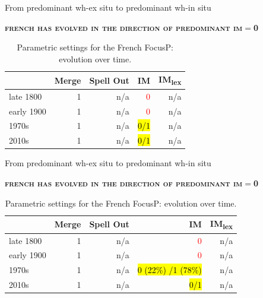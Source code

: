 \documentclass[lesson_slides]{subfiles}
\begin{document}
\begin{frame}[c]{From predominant wh-ex situ to predominant wh-in situ}

        \textbf{\textsc{french has evolved in the direction of predominant im$=$0}}

        \begin{table}[H]
        \centering
        \begin{tabular}{|l|r|r|r|r|}
        \hline
         & Merge & Spell Out & IM & IM\textsubscript{lex} \\
        \hline
        late 1800 & 1 & n/a & \textcolor{red}{0} & n/a \\
        \hline
        early 1900 & 1 & n/a & \textcolor{red}{0} & n/a \\
        \hline
        1970s & 1 & n/a & \hl{0/1} & n/a \\
        \hline
        2010s & 1 & n/a & \hl{0/1} & n/a \\
        \hline
        \end{tabular}
        \caption{\label{tab:samp}Parametric settings for the French FocusP: evolution over time.}
    \end{table}
  
\end{frame}
\begin{frame}[c]{From predominant wh-ex situ to predominant wh-in situ}

        \textbf{\textsc{french has evolved in the direction of predominant im$=$0}}

        \begin{table}[H]
        \centering
        \begin{tabular}{|l|r|r|r|r|}
        \hline
         & Merge & Spell Out & IM & IM\textsubscript{lex} \\
        \hline
        late 1800 & 1 & n/a & \textcolor{red}{0} & n/a \\
        \hline
        early 1900 & 1 & n/a & \textcolor{red}{0} & n/a \\
        \hline
        1970s & 1 & n/a & \hl{0 (22\%) /1 (78\%)} & n/a \\
        \hline
        2010s & 1 & n/a & \hl{0/1} & n/a \\
        \hline
        \end{tabular}
        \caption{\label{tab:samp}Parametric settings for the French FocusP: evolution over time.}
    \end{table}
  
\end{frame}
\end{document}
